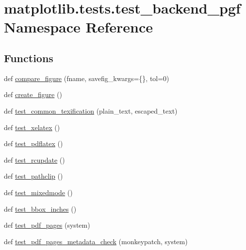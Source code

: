 \hypertarget{namespacematplotlib_1_1tests_1_1test__backend__pgf}{}\section{matplotlib.\+tests.\+test\+\_\+backend\+\_\+pgf Namespace Reference}
\label{namespacematplotlib_1_1tests_1_1test__backend__pgf}
\subsection*{Functions}
\begin{DoxyCompactItemize}
\item 
def \hyperlink{namespacematplotlib_1_1tests_1_1test__backend__pgf_a4b86e539ef1b961f77ff21dccc933835}{compare\+\_\+figure} (fname, savefig\+\_\+kwargs=\{\}, tol=0)
\item 
def \hyperlink{namespacematplotlib_1_1tests_1_1test__backend__pgf_a15fd340ec7aff81c1677dedd5913de90}{create\+\_\+figure} ()
\item 
def \hyperlink{namespacematplotlib_1_1tests_1_1test__backend__pgf_a1c9e64220f5990b988014d260d171f5a}{test\+\_\+common\+\_\+texification} (plain\+\_\+text, escaped\+\_\+text)
\item 
def \hyperlink{namespacematplotlib_1_1tests_1_1test__backend__pgf_ab4cd9d8a7e84339a0648c2719ee3452d}{test\+\_\+xelatex} ()
\item 
def \hyperlink{namespacematplotlib_1_1tests_1_1test__backend__pgf_ad2ee08e672ef462b5b547566306c09c1}{test\+\_\+pdflatex} ()
\item 
def \hyperlink{namespacematplotlib_1_1tests_1_1test__backend__pgf_a669ddf36925733e1eb220ff050606c56}{test\+\_\+rcupdate} ()
\item 
def \hyperlink{namespacematplotlib_1_1tests_1_1test__backend__pgf_a66dffd7b80d276c94f46849cae6667d4}{test\+\_\+pathclip} ()
\item 
def \hyperlink{namespacematplotlib_1_1tests_1_1test__backend__pgf_a4e45c425e87eae2d4dd587363d1862f9}{test\+\_\+mixedmode} ()
\item 
def \hyperlink{namespacematplotlib_1_1tests_1_1test__backend__pgf_ad2d54400250fb5181b66416fc6397de0}{test\+\_\+bbox\+\_\+inches} ()
\item 
def \hyperlink{namespacematplotlib_1_1tests_1_1test__backend__pgf_a902ddb543451d24f0ad300482e7d4c08}{test\+\_\+pdf\+\_\+pages} (system)
\item 
def \hyperlink{namespacematplotlib_1_1tests_1_1test__backend__pgf_ac12a7a5f8c2a72d6b91e60ad2106f2f5}{test\+\_\+pdf\+\_\+pages\+\_\+metadata\+\_\+check} (monkeypatch, system)

\end{DoxyCompactItemize}

